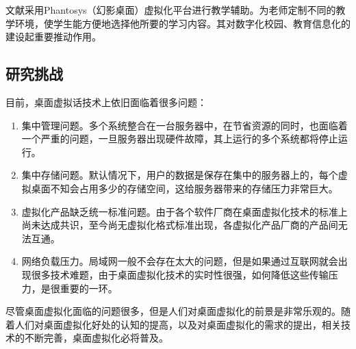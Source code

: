 \documentclass[10pt,a4paper]{article}
\begin{document}
\begin{CJK*}{UTF8}{gkai}
文献\cite{8}采用Phantosys（幻影桌面）虚拟化平台进行教学辅助。为老师定制不同的教学环境，使学生能方便地选择他所要的学习内容。其对数字化校园、教育信息化的建设起重要推动作用。

\subsection{研究挑战}
目前，桌面虚拟话技术上依旧面临着很多问题：
\begin{enumerate}
\item	集中管理问题。多个系统整合在一台服务器中，在节省资源的同时，也面临着一个严重的问题，一旦服务器出现硬件故障，其上运行的多个系统都将停止运行。
\item	集中存储问题。默认情况下，用户的数据是保存在集中的服务器上的，每个虚拟桌面不知会占用多少的存储空间，这给服务器带来的存储压力非常巨大。
\item	虚拟化产品缺乏统一标准问题。由于各个软件厂商在桌面虚拟化技术的标准上尚未达成共识，至今尚无虚拟化格式标准出现，各虚拟化产品厂商的产品间无法互通。
\item	网络负载压力。局域网一般不会存在太大的问题，但是如果通过互联网就会出现很多技术难题，由于桌面虚拟化技术的实时性很强，如何降低这些传输压力，是很重要的一环。
\end{enumerate}
尽管桌面虚拟化面临的问题很多，但是人们对桌面虚拟化的前景是非常乐观的。随着人们对桌面虚拟化好处的认知的提高，以及对桌面虚拟化的需求的提出，相关技术的不断完善，桌面虚拟化必将普及。
		
		

\clearpage     
\end{CJK*}
\end{document}
